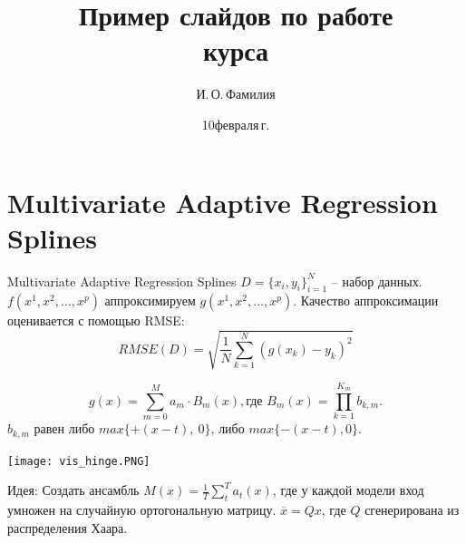 \documentclass[10pt,pdf,hyperref={unicode}]{beamer}
\title[Пример слайдов по работе]{Пример слайдов по работе \\ курса}
\author{И.\,О.\,Фамилия}
\institute[]{Московский физико-технический институт}
\date[2022]{\small 10\;февраля\;2022\,г.}
\begin{document}
\section{Multivariate Adaptive Regression Splines}
\begin{frame}{Multivariate Adaptive Regression Splines}
$D = \{x_i, y_i\}_{i=1}^{N}$ -- набор данных. $f(x^1, x^2, ..., x^p)$ аппроксимируем $g(x^1, x^2, ..., x^p)$. Качество аппроксимации оценивается с помощью RMSE:
$$RMSE(D) = \sqrt{\frac{1}{N}\sum_{k=1}^{N} (g(x_k) - y_k)^2}$$

$$g(x) = \sum_{m=0}^{M} a_m \cdot B_m(x), \textit{где~} B_m(x) = \prod_{k=1}^{K_m} b_{k,m}.$$
$b_{k,m}$ равен либо $max\{+(x-t),~0\}$, либо $max\{-(x-t), 0\}.$

\begin{minipage}[t]{0.2\textwidth}
\texttt{[image: vis\_hinge.PNG]}

\end{minipage}%
\hfill
\hfill
\hskip-2cm
\begin{minipage}[t]{0.6\textwidth}
\vskip-2.5cm
Идея: Создать ансамбль $M(x) = \frac{1}{T}\sum_{t}^{T}a_t(x)$, где у каждой модели вход умножен на случайную ортогональную матрицу. $\overline{x} = Qx$, где $Q$ сгенерирована из распределения Хаара.
\end{minipage}


\end{frame}

\end{document}
